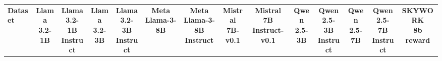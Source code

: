 
\begin{table*}[h!]
\centering
\tiny
\renewcommand{\arraystretch}{1.5}
\setlength{\tabcolsep}{3pt}

\begin{tabular}{l|ccccccccccccc}

\hline
\rowcolor{apricot}
\textbf{Dataset} & 

\shortstack{\textbf{Llama} \\ \textbf{3.2-1B}} & 
\shortstack{\textbf{Llama} \\ \textbf{3.2-1B}\\\textbf{Instruct}} & 
\shortstack{\textbf{Llama} \\ \textbf{3.2-3B}} & 
\shortstack{\textbf{Llama} \\ \textbf{3.2-3B}\\\textbf{Instruct}} & 
\shortstack{\textbf{Meta} \\ \textbf{Llama-3-8B}} & 
\shortstack{\textbf{Meta} \\ \textbf{Llama-3-8B}\\\textbf{Instruct}} & 
\shortstack{\textbf{Mistral} \\ \textbf{7B-v0.1}} & 
\shortstack{\textbf{Mistral} \\ \textbf{7B}\\\textbf{Instruct-v0.1}} & 
\shortstack{\textbf{Qwen} \\ \textbf{2.5-3B}} & 
\shortstack{\textbf{Qwen} \\ \textbf{2.5-3B}\\\textbf{Instruct}} & 
\shortstack{\textbf{Qwen} \\ \textbf{2.5-7B}} & 
\shortstack{\textbf{Qwen} \\ \textbf{2.5-7B}\\\textbf{Instruct}}& 
\shortstack{\textbf{SKYWORK} \\ \textbf{8b}\\ \textbf{reward}} \\


\end{tabular}
\end{table*}

